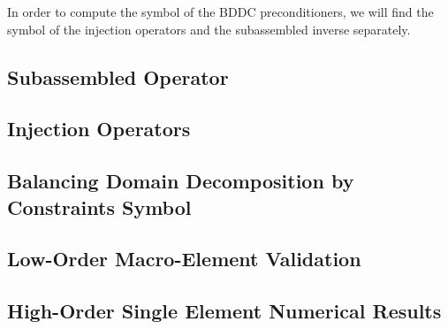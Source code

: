 In order to compute the symbol of the BDDC preconditioners, we will find the symbol of the injection operators and the subassembled inverse separately.

\subsection{Subassembled Operator}


\subsection{Injection Operators}


\subsection{Balancing Domain Decomposition by Constraints Symbol}


\subsection{Low-Order Macro-Element Validation}


\subsection{High-Order Single Element Numerical Results}

